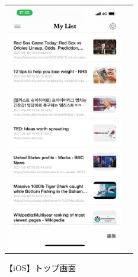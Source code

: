 \begin{figure}[htbp]
\begin{tabular}{cc}
    \begin{minipage}[t]{0.45\hsize}
      \caption{【iOS】トップ画面}
      \label{fig:usage-ios-top}
      \begin{center}
        \includegraphics[bb=0 0 585 1266,width=5cm]{img/030_web_snapshot_system/ios/usage-ios-top.pdf}
      \end{center}
    \end{minipage}
  \end{tabular}
\end{figure}

